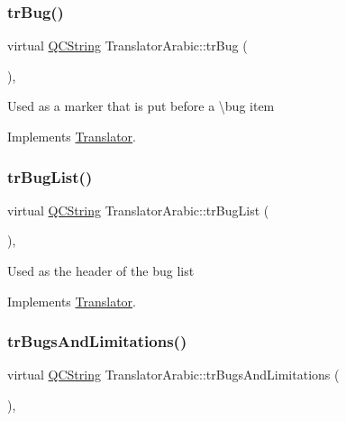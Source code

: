 \mbox{\label{class_translator_arabic_aacd74b628e36340a3b593435bc295529}} 
\subsubsection{\texorpdfstring{trBug()}{trBug()}}
{\footnotesize\ttfamily virtual \mbox{\hyperlink{class_q_c_string}{Q\+C\+String}} Translator\+Arabic\+::tr\+Bug (\begin{DoxyParamCaption}{ }\end{DoxyParamCaption})\hspace{0.3cm}{\ttfamily [inline]}, {\ttfamily [virtual]}}

Used as a marker that is put before a \textbackslash{}bug item 

Implements \mbox{\hyperlink{class_translator}{Translator}}.

\mbox{\label{class_translator_arabic_a1a0f397c655873ff36805aef2a2f4282}} 
\subsubsection{\texorpdfstring{trBugList()}{trBugList()}}
{\footnotesize\ttfamily virtual \mbox{\hyperlink{class_q_c_string}{Q\+C\+String}} Translator\+Arabic\+::tr\+Bug\+List (\begin{DoxyParamCaption}{ }\end{DoxyParamCaption})\hspace{0.3cm}{\ttfamily [inline]}, {\ttfamily [virtual]}}

Used as the header of the bug list 

Implements \mbox{\hyperlink{class_translator}{Translator}}.

\mbox{\label{class_translator_arabic_aca059592bf0ce2039a8d02a80d425f63}} 
\subsubsection{\texorpdfstring{trBugsAndLimitations()}{trBugsAndLimitations()}}
{\footnotesize\ttfamily virtual \mbox{\hyperlink{class_q_c_string}{Q\+C\+String}} Translator\+Arabic\+::tr\+Bugs\+And\+Limitations (\begin{DoxyParamCaption}{ }\end{DoxyParamCaption})\hspace{0.3cm}{\ttfamily [inline]}, {\ttfamily [virtual]}}

